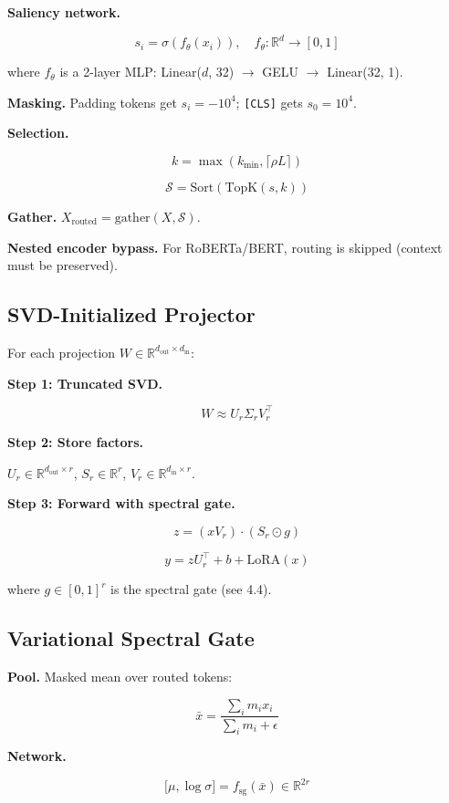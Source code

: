 \textbf{Saliency network.}

\[
s_i = \sigma(f_\theta(x_i)), \quad f_\theta: \mathbb{R}^d \to [0, 1]
\tag{4.1}
\]

where $f_\theta$ is a 2-layer MLP: Linear($d$, 32) $\to$ GELU $\to$ Linear(32, 1).

\textbf{Masking.} Padding tokens get $s_i = -10^4$; \texttt{[CLS]} gets $s_0 = 10^4$.

\textbf{Selection.}

\[
k = \max(k_\text{min}, \lceil \rho L \rceil)
\tag{4.2}
\]

\[
\mathcal{S} = \text{Sort}(\text{TopK}(s, k))
\tag{4.3}
\]

\textbf{Gather.} $X_\text{routed} = \text{gather}(X, \mathcal{S})$.

\textbf{Nested encoder bypass.} For RoBERTa/BERT, routing is skipped (context 
must be preserved).

\subsection{SVD-Initialized Projector}

For each projection $W \in \mathbb{R}^{d_\text{out} \times d_\text{in}}$:

\textbf{Step 1: Truncated SVD.}

\[
W \approx U_r \Sigma_r V_r^\top
\tag{4.4}
\]

\textbf{Step 2: Store factors.}

$U_r \in \mathbb{R}^{d_\text{out} \times r}$, $S_r \in \mathbb{R}^r$, 
$V_r \in \mathbb{R}^{d_\text{in} \times r}$.

\textbf{Step 3: Forward with spectral gate.}

\[
z = (x V_r) \cdot (S_r \odot g)
\tag{4.5}
\]

\[
y = z U_r^\top + b + \text{LoRA}(x)
\tag{4.6}
\]

where $g \in [0, 1]^r$ is the spectral gate (see  4.4).

\subsection{Variational Spectral Gate}

\textbf{Pool.} Masked mean over routed tokens:

\[
\bar{x} = \frac{\sum_i m_i x_i}{\sum_i m_i + \epsilon}
\tag{4.7}
\]

\textbf{Network.}

\[
{[}\mu, \log \sigma] = f_\text{sg}(\bar{x}) \in \mathbb{R}^{2r}
\tag{4.8}
\]


